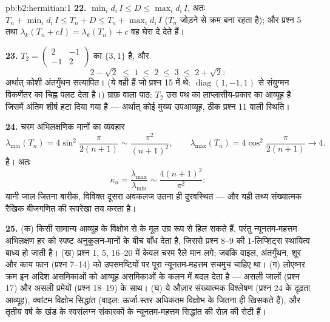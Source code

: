 \begin{solution}{pb:b2:hermitian:1}
\textbf{22.} $\min_id_i\,I \leq D \leq \max_id_i\,I$, अतः $T_n +
\min_id_i\,I \leq T_n + D \leq T_n + \max_id_i\,I$ ($T_n$ जोड़ने से क्रम बना रहता है); और प्रश्न 5
तथा $\lambda_k(T_n + cI) = \lambda_k(T_n) + c$ वह घेरा दे देते हैं।

\textbf{23.} $T_2 = \begin{pmatrix} 2 & -1\\ -1 &
2\end{pmatrix}$ का  $\{3, 1\}$ है, और
\[
2 - \sqrt2 \;\leq\; 1 \;\leq\; 2 \;\leq\; 3 \;\leq\; 2 +
\sqrt2 :
\]
अर्थात् कोशी अंतर्गुंथन सत्यापित। (ये वही  हैं जो प्रश्न 15 में
थे: $\operatorname{diag}(1,-1,1)$ से संयुग्मन विकर्णेतर का चिह्न पलट देता है।) ग्राफ़ वाला पाठ:
$T_2$ उस पथ का लाप्लासीय-प्रकार का आव्यूह है जिसमें अंतिम शीर्ष हटा दिया गया
है --- अर्थात् कोई मुख्य उपआव्यूह, ठीक प्रश्न 11 वाली स्थिति।

\textbf{24.} चरम अभिलक्षणिक मानों का व्यवहार
\[
\lambda_{\min}(T_n) = 4\sin^2\frac{\pi}{2(n+1)}
\sim \frac{\pi^2}{(n+1)^2},
\qquad
\lambda_{\max}(T_n) = 4\cos^2\frac{\pi}{2(n+1)}
\longrightarrow 4 .
\]
है। अतः
\[
\kappa_n = \frac{\lambda_{\max}}{\lambda_{\min}}
\sim \frac{4(n+1)^2}{\pi^2} :
\]
यानी जाल जितना बारीक, विविक्त दूसरा अवकलज उतना ही दुरवस्थित --- और यही
तथ्य संख्यात्मक रैखिक बीजगणित की रूपरेखा तय करता है।

\textbf{25.} (क) किसी सामान्य आव्यूह के विक्षोभ से  के
मूल उग्र रूप से हिल सकते हैं, परंतु न्यूनतम-महत्तम अभिलक्षण हर 
 को स्पष्ट अनुकूलन-मानों के बीच बाँध देता है, जिससे प्रश्न
8--9 की $1$-लिप्शिट्स स्थायित्व बाध्य हो जाती है। (ख) प्रश्न 1, 5, 16--20
में केवल चरम रैले मान लगे; जबकि वाइल, अंतर्गुंथन, शूर और काय फान (प्रश्न
7--14) को उपसमष्टियों पर पूरा न्यूनतम-महत्तम सचमुच चाहिए था। (ग) लोएव्नर
क्रम इन अदिश असमिकाओं को आव्यूह असमिकाओं के कलन में बदल देता है --- असली
जालों (प्रश्न 17) और असली प्रमेयों (प्रश्न 18--19) के साथ। (घ) ये औज़ार
संख्यात्मक विश्लेषण (प्रश्न 24 के दृढ़ता आव्यूह), क्वांटम विक्षोभ सिद्धांत
(वाइल: ऊर्जा-स्तर अधिकतम विक्षोभ के  जितना ही खिसकते हैं), और तृतीय
वर्ष के खंड के  स्वसंलग्न संकारकों के न्यूनतम-महत्तम सिद्धांत की रोज़
की रोटी हैं।
\end{solution}
